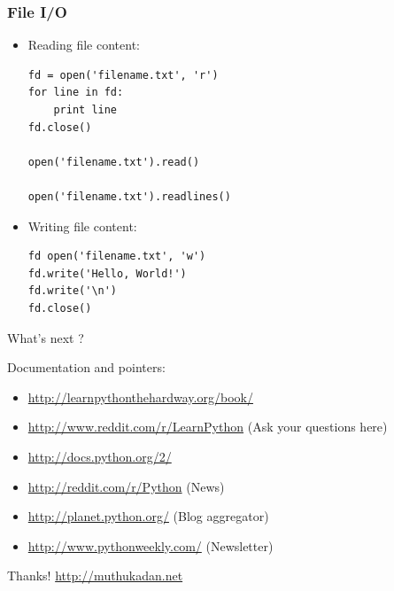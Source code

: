 \documentclass[12pt,handout]{beamer}
\begin{document}
\begin{frame}[fragile]
\frametitle{File I/O}
\begin{itemize}
\item Reading file content:
\small{
\begin{verbatim}
fd = open('filename.txt', 'r')
for line in fd:
    print line
fd.close()

open('filename.txt').read()

open('filename.txt').readlines()
\end{verbatim}
}

\item Writing file content:

\small{
\begin{verbatim}
fd open('filename.txt', 'w')
fd.write('Hello, World!')
fd.write('\n')
fd.close()
\end{verbatim}
}
\end{itemize}
\end{frame}

\begin{frame}{What's next ?}

Documentation and pointers:

\begin{itemize}
\item \url{http://learnpythonthehardway.org/book/}
\item \url{http://www.reddit.com/r/LearnPython} (Ask your questions here)
\item \url{http://docs.python.org/2/}
\item \url{http://reddit.com/r/Python} (News)
\item \url{http://planet.python.org/} (Blog aggregator)
\item \url{http://www.pythonweekly.com/} (Newsletter)
\end{itemize}

\end{frame}

\begin{frame}{Thanks!}
\center \url{http://muthukadan.net}
\end{frame}
\end{document}
